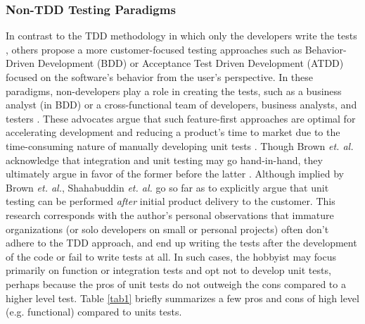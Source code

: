 \subsubsection{Non-TDD Testing Paradigms}\label{sec:intro-}
In contrast to the TDD methodology in which only the developers write the tests
\cite{axelrod2018unit}, 
others \cite{brown2013agility, shahabuddin2016integration, moe2019comparative} propose a 
more customer-focused testing approaches such as Behavior-Driven Development (BDD)
or Acceptance Test Driven Development (ATDD) focused on the software's behavior 
from the user's perspective. In these paradigms, non-developers play a role 
in creating the tests, such as a business analyst (in BDD) \cite{barus2019implementation}
or a cross-functional team of developers, business analysts, and testers \cite{pugh2010lean}.
These advocates argue that such feature-first approaches are optimal for accelerating development 
and reducing a product's time to market due to the time-consuming nature of manually
developing unit tests \cite{kahur2023java, shahabuddin2016integration}.
Though Brown \textit{et. al.} acknowledge that integration and unit
testing may go hand-in-hand, they 
ultimately argue in favor of the former before the latter \cite{brown2013agility}.  
Although implied by Brown \textit{et. al.}, Shahabuddin \textit{et. al.} 
\cite{shahabuddin2016integration} go so far as to explicitly argue that unit
testing can be performed \textit{after} initial product delivery to the customer.
%
This research corresponds with the author’s personal observations that immature 
organizations (or solo developers on small or personal projects)
often don’t adhere to the  TDD approach, and end up writing the tests 
after the development of the code or fail to write tests at all. In such cases,
the hobbyist may focus primarily on function or integration tests
and opt not to develop unit tests, perhaps because the pros of unit tests
do not outweigh the cons compared to a higher level test.
%
Table \ref{tab1} briefly summarizes a few pros and cons of high level 
(e.g. functional) compared to units tests.

